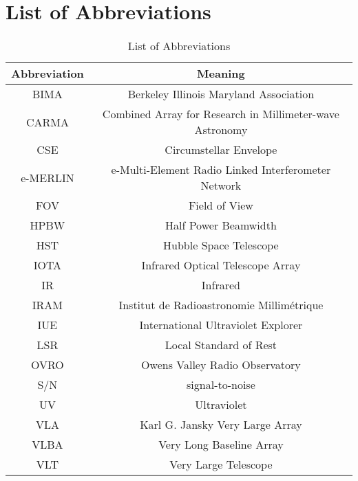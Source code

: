 
\chapter{List of Abbreviations}
\label{app:1}

\begin{table}[!hbt]
\begin{center}
\caption[List of Abbreviations]
{List of Abbreviations}
\begin{tabular}{cc}
\hline
\hline
\rule{0pt}{2.5ex}Abbreviation & Meaning\\
\hline
BIMA & Berkeley Illinois Maryland Association \\
CARMA & Combined Array for Research in Millimeter-wave Astronomy \\
CSE & Circumstellar Envelope \\
e-MERLIN &  e-Multi-Element Radio Linked Interferometer Network \\
FOV & Field of View \\
HPBW & Half Power Beamwidth \\
HST & Hubble Space Telescope \\
IOTA & Infrared Optical Telescope Array\\
IR & Infrared \\
IRAM & Institut de Radioastronomie Millim\'etrique \\
IUE & International Ultraviolet Explorer \\
LSR & Local Standard of Rest \\
OVRO & Owens Valley Radio Observatory \\
S/N & signal-to-noise\\
UV & Ultraviolet \\
VLA & Karl G. Jansky Very Large Array \\
VLBA & Very Long Baseline Array \\
VLT & Very Large Telescope \\

\hline
\end{tabular}
\label{tab:6.4.1}
\end{center}
\end{table}


